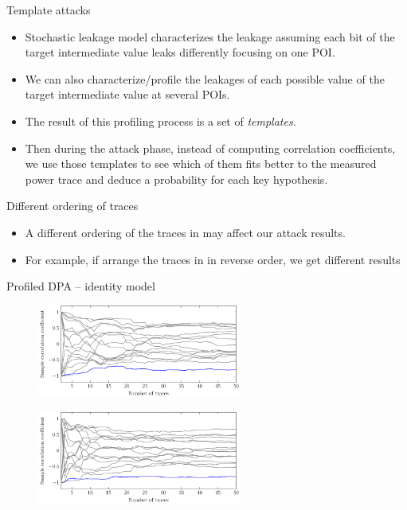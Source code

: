 \begin{frame}{Template attacks}
    \begin{itemize}
        \item Stochastic leakage model characterizes the leakage assuming each bit of the target intermediate value leaks differently focusing on one POI.
        \item We can also characterize/profile the leakages of each possible value of the target intermediate value at several POIs.
        \item The result of this profiling process is a set of \textit{templates}.
        \item Then during the attack phase, instead of computing correlation coefficients, we use those templates to see which of them fits better to the measured power trace and deduce a probability for each key hypothesis.
    \end{itemize}
\end{frame}

\begin{frame}{Different ordering of traces}
    \begin{itemize}
        \item A different ordering of the traces in \dataranone may affect our attack results.
        \item For example, if arrange the traces in \dataranone in reverse order, we get different results
    \end{itemize}
\end{frame}

\begin{frame}{Profiled DPA -- identity model}
     \begin{figure}[h]
    \centering
    \includegraphics[width=0.6\textwidth]{fig/correlation_POI_identity.pdf}
\end{figure}
 \begin{figure}[h]
    \centering
    \includegraphics[width=0.6\textwidth]{fig/correlation_POI_identity_reverse.pdf}
\end{figure}
\end{frame}

